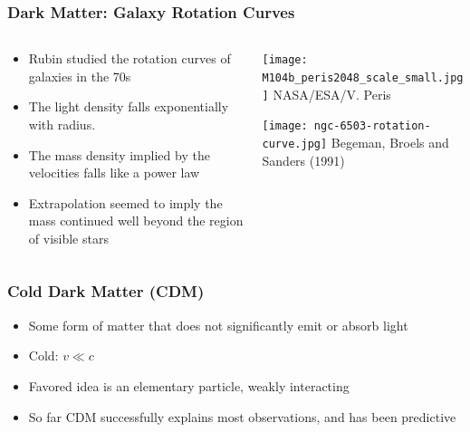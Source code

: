 \documentclass{beamer}
\begin{document}
\frame
{
    \frametitle{Dark Matter: Galaxy Rotation Curves}

    \begin{columns}
        \begin{column}{0.5\textwidth}    
            \begin{itemize}

                \item Rubin studied the rotation curves of galaxies in the 70s

                \item The light density falls exponentially with radius.

                \item The mass density implied by the velocities falls like a power law

                \item Extrapolation seemed to imply the mass continued well
                    beyond the region of visible stars

            \end{itemize}
        \end{column}
        \begin{column}{0.5\textwidth}
            \begin{center}
                \texttt{[image: M104b\_peris2048\_scale\_small.jpg]}
                \newline
                \hfill {\tiny NASA/ESA/V. Peris}

                \texttt{[image: ngc-6503-rotation-curve.jpg]}
                \newline
                {\tiny Begeman, Broels and Sanders (1991)}
            \end{center}
        \end{column}
    \end{columns}
}

\frame
{
    \frametitle{Cold Dark Matter (CDM)}


    \begin{itemize}

        \item Some form of matter that does not significantly emit or absorb light

        \item Cold:  $v \ll c$

        \item Favored idea is an elementary particle, weakly interacting

        \item So far CDM successfully explains most observations, and has been
            predictive

    \end{itemize}


}
\end{document}
